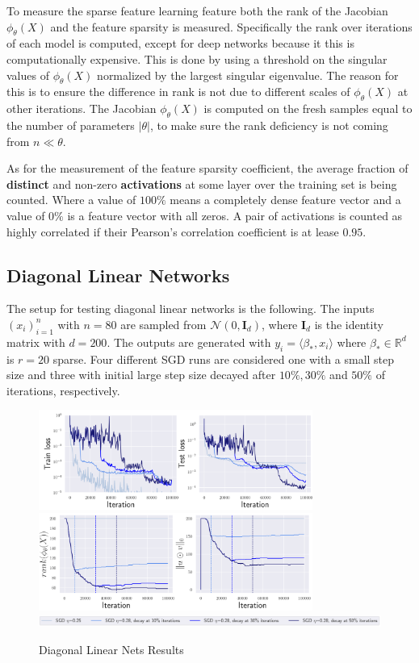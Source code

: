 To measure the sparse feature learning feature both the rank of the Jacobian
$\phi_{\theta}(X)$ and the feature sparsity is measured. Specifically the
rank over iterations of each model is computed, except for deep networks
because it this is computationally expensive. This is done by using a
threshold on the singular values of $\phi_\theta(X)$ normalized by the
largest singular eigenvalue. The reason for this is to ensure the difference
in rank is not due to different scales of $\phi_\theta(X)$ at other
iterations. The Jacobian $\phi_\theta(X)$ is computed on the fresh samples
equal to the number of parameters $ |\theta |$, to make sure the rank
deficiency is not coming from $n \ll \theta $.
\newline

As for the measurement of the feature sparsity coefficient, the average
fraction of \textbf{distinct} and non-zero \textbf{activations} at some layer
over the training set is being counted. Where a value of $100\%$ means a
completely dense feature vector and a value of $0\%$ is a feature vector with
all zeros. A pair of activations is counted as highly correlated if their
Pearson's correlation coefficient is at lease $0.95$.

\subsection{Diagonal Linear Networks}
The setup for testing diagonal linear networks is the following. The inputs
$(x_i)_{i=1}^{n}$ with $n=80$ are sampled from $\mathcal{N}(0,
\mathbf{I}_d)$, where $\mathbf{I}_d$ is the identity matrix with $d=200$. The
outputs are generated with $y_i = \langle \beta_* , x_i\rangle$ where
$\beta_* \in \mathbb{R}^{d}$ is $r=20$ sparse. Four different SGD runs are
considered one with a small step size and three with initial large step size
decayed after  $10\%, 30\%$ and $50\%$ of iterations, respectively.

\begin{figure}[H]
    \centering
    \includegraphics[width=0.8\textwidth]{./pics/dn_loss.png}
    \includegraphics[width=0.8\textwidth]{./pics/dn_sparsity.png}
    \includegraphics[width=\textwidth]{./pics/dn_setup.png}
    \caption{Diagonal Linear Nets Results \label{fig: diagonal}}
\end{figure}

